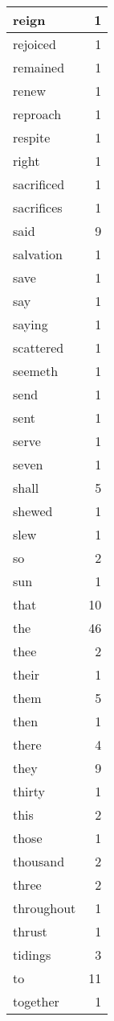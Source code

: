\begin{center}
\begin{longtable}{l|r}
reign & 1 \\ \hline
rejoiced & 1 \\ \hline
remained & 1 \\ \hline
renew & 1 \\ \hline
reproach & 1 \\ \hline
respite & 1 \\ \hline
right & 1 \\ \hline
sacrificed & 1 \\ \hline
sacrifices & 1 \\ \hline
said & 9 \\ \hline
salvation & 1 \\ \hline
save & 1 \\ \hline
say & 1 \\ \hline
saying & 1 \\ \hline
scattered & 1 \\ \hline
seemeth & 1 \\ \hline
send & 1 \\ \hline
sent & 1 \\ \hline
serve & 1 \\ \hline
seven & 1 \\ \hline
shall & 5 \\ \hline
shewed & 1 \\ \hline
slew & 1 \\ \hline
so & 2 \\ \hline
sun & 1 \\ \hline
that & 10 \\ \hline
the & 46 \\ \hline
thee & 2 \\ \hline
their & 1 \\ \hline
them & 5 \\ \hline
then & 1 \\ \hline
there & 4 \\ \hline
they & 9 \\ \hline
thirty & 1 \\ \hline
this & 2 \\ \hline
those & 1 \\ \hline
thousand & 2 \\ \hline
three & 2 \\ \hline
throughout & 1 \\ \hline
thrust & 1 \\ \hline
tidings & 3 \\ \hline
to & 11 \\ \hline
together & 1 \\ \hline

\end{longtable}
\end{center}
